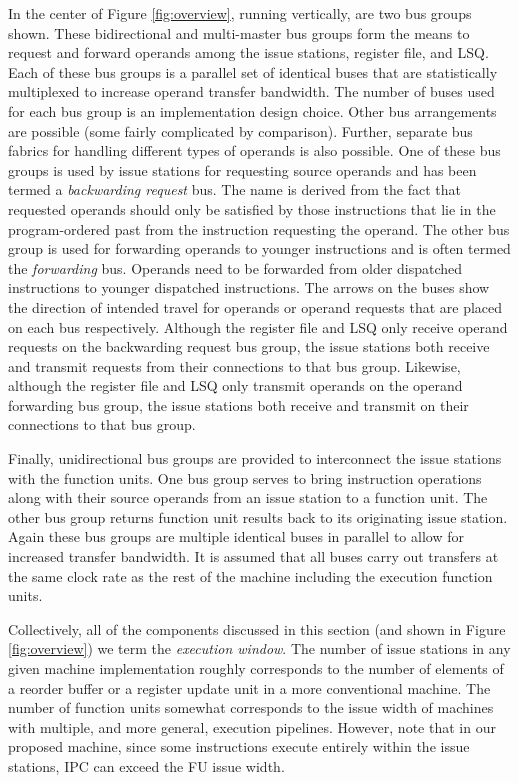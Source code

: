 \documentclass[10pt,dvips]{article}
\begin{document}
In the center of Figure \ref{fig:overview},
running vertically, are two bus groups shown.
These bidirectional and multi-master bus groups
form the means to request and forward operands
among the issue stations, register file, and LSQ.
Each of these bus groups is a parallel set of identical buses
that are statistically multiplexed to increase operand transfer
bandwidth.  The number of buses used for each bus group is
an implementation design choice.
Other bus arrangements are possible (some fairly complicated by
comparison).  
Further, separate bus fabrics for handling
different types of operands is also possible.
One of these bus groups is used by issue stations
for requesting source operands and
has been termed a \textit{backwarding request} bus.
The name is derived from the fact that requested operands should
only be satisfied by those instructions that lie in the program-ordered
past from the instruction requesting the operand.
The other bus group is used for forwarding operands to younger instructions
and is often termed the \textit{forwarding} bus.
Operands need to be forwarded from older dispatched
instructions to younger dispatched instructions.
The arrows on the buses show the direction of intended travel
for operands or operand requests that are placed on each bus
respectively.  Although the register file and LSQ only receive
operand requests on the backwarding request bus group, the issue stations
both receive and transmit requests from their connections to that
bus group.  Likewise, although the register file and LSQ only transmit
operands on the operand forwarding bus group, the issue stations
both receive and transmit on their connections to that bus group.

Finally, unidirectional bus groups are provided to interconnect
the issue stations with the function units.
One bus group serves to bring instruction
operations along with their source operands from an issue
station to a function unit.
The other bus group returns function unit results back to its
originating issue station.
Again these bus groups are multiple identical buses in
parallel to allow for increased transfer bandwidth.
It is assumed that all buses carry out transfers at the same
clock rate as the rest of the machine including the execution
function units.

Collectively, all of the components discussed in this section
(and shown in 
Figure \ref{fig:overview}) we term the \textit{execution window}.
The number of issue stations in
any given machine implementation roughly corresponds to the
number of elements of a reorder buffer or a register update unit
in a more conventional machine.
The number of function units somewhat corresponds to the
issue width of machines with multiple, and more general, execution pipelines.
However, note that in our proposed machine, since some instructions
execute entirely within the issue stations, IPC can exceed the FU
issue width.
%
\end{document}
